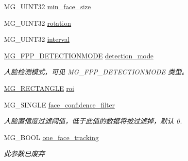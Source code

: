 \begin{DoxyCompactItemize}
\item 
M\+G\+\_\+\+U\+I\+N\+T32 \hyperlink{struct_m_g___f_p_p___a_p_i_c_o_n_f_i_g_ae10b49c357efffd6a8d36cb7ad59c129}{min\+\_\+face\+\_\+size}
\item 
M\+G\+\_\+\+U\+I\+N\+T32 \hyperlink{struct_m_g___f_p_p___a_p_i_c_o_n_f_i_g_ad0896de3b631a7d8cf84fbfc8015d533}{rotation}
\item 
M\+G\+\_\+\+U\+I\+N\+T32 \hyperlink{struct_m_g___f_p_p___a_p_i_c_o_n_f_i_g_ad692e64016f93f8a1ec7dd68e40518ab}{interval}
\item 
\mbox{\label{struct_m_g___f_p_p___a_p_i_c_o_n_f_i_g_a65065072fa33c2ab05ef0c945cfc198a}} 
\hyperlink{_m_g___facepp_8h_aaec1d1d953deb8521af35bd18b8a811e}{M\+G\+\_\+\+F\+P\+P\+\_\+\+D\+E\+T\+E\+C\+T\+I\+O\+N\+M\+O\+DE} \hyperlink{struct_m_g___f_p_p___a_p_i_c_o_n_f_i_g_a65065072fa33c2ab05ef0c945cfc198a}{detection\+\_\+mode}
\begin{DoxyCompactList}\small\item\em 人脸检测模式，可见 M\+G\+\_\+\+F\+P\+P\+\_\+\+D\+E\+T\+E\+C\+T\+I\+O\+N\+M\+O\+DE 类型。 \end{DoxyCompactList}\item 
\hyperlink{struct_m_g___r_e_c_t_a_n_g_l_e}{M\+G\+\_\+\+R\+E\+C\+T\+A\+N\+G\+LE} \hyperlink{struct_m_g___f_p_p___a_p_i_c_o_n_f_i_g_aac46c1afd3c12df2c30b29028554a72e}{roi}
\item 
\mbox{\label{struct_m_g___f_p_p___a_p_i_c_o_n_f_i_g_ab0b8a988c47c29a0d20e7a32427316b8}} 
M\+G\+\_\+\+S\+I\+N\+G\+LE \hyperlink{struct_m_g___f_p_p___a_p_i_c_o_n_f_i_g_ab0b8a988c47c29a0d20e7a32427316b8}{face\+\_\+confidence\+\_\+filter}
\begin{DoxyCompactList}\small\item\em 人脸置信度过滤阈值，低于此值的数据将被过滤掉，默认 0. \end{DoxyCompactList}\item 
\mbox{\label{struct_m_g___f_p_p___a_p_i_c_o_n_f_i_g_a3b3d578761f1689dcdf109ed7706ea62}} 
M\+G\+\_\+\+B\+O\+OL \hyperlink{struct_m_g___f_p_p___a_p_i_c_o_n_f_i_g_a3b3d578761f1689dcdf109ed7706ea62}{one\+\_\+face\+\_\+tracking}
\begin{DoxyCompactList}\small\item\em 此参数已废弃 \end{DoxyCompactList}\end{DoxyCompactItemize}



